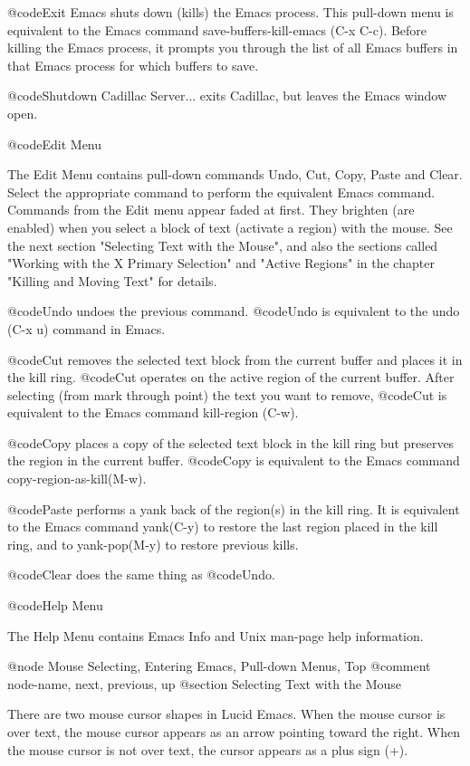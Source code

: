 {{@code{Exit Emacs} shuts down (kills) the Emacs process.  This pull-down menu is equivalent 
to the Emacs command save-buffers-kill-emacs (C-x C-c).  Before killing 
the Emacs process, it prompts you through the list 
of all Emacs buffers in that Emacs process for
which buffers to save.

@code{Shutdown Cadillac Server...} exits Cadillac, but leaves the Emacs window open.

@code{Edit Menu}

The Edit Menu contains pull-down commands Undo, Cut,
Copy, Paste and Clear.
Select the appropriate command to perform the 
equivalent Emacs command.  Commands from
the Edit menu appear faded at first.  They brighten (are enabled) when you
select a block of text (activate a region) with the mouse.
See the next section "Selecting Text with the Mouse", and also the sections 
called "Working with the X Primary Selection" and "Active Regions" in the chapter 
"Killing and Moving Text" 
for details.

@code{Undo} undoes the previous command.  @code{Undo} is equivalent to the undo (C-x u) command 
in Emacs.

@code{Cut} removes the selected text block from the current buffer and places it in the kill ring.
@code{Cut} operates on the active region of the current buffer.  After selecting (from mark 
through point) the text
you want to remove, @code{Cut} is equivalent to the Emacs command kill-region (C-w).  

@code{Copy} places a copy of the selected text block in the kill ring but preserves the region
in the current buffer.  @code{Copy} is equivalent to the Emacs command copy-region-as-kill(M-w).

@code{Paste} performs a yank back of the region(s) in the kill ring. It is equivalent to the 
Emacs command yank(C-y) to restore the last region placed in the kill ring,
and to yank-pop(M-y) to restore previous kills. 

@code{Clear} does the same thing as @code{Undo}.


@code{Help Menu}

The Help Menu contains Emacs Info and Unix man-page help information. 

@node Mouse Selecting, Entering Emacs, Pull-down Menus, Top
@comment  node-name,  next,  previous,  up
@section Selecting Text with the Mouse

  There are two mouse cursor shapes in Lucid Emacs.  When the mouse cursor 
is over text, the mouse cursor appears as an arrow pointing toward the right. 
When the 
mouse cursor is not over text, the cursor appears as a plus sign (+).

}}
